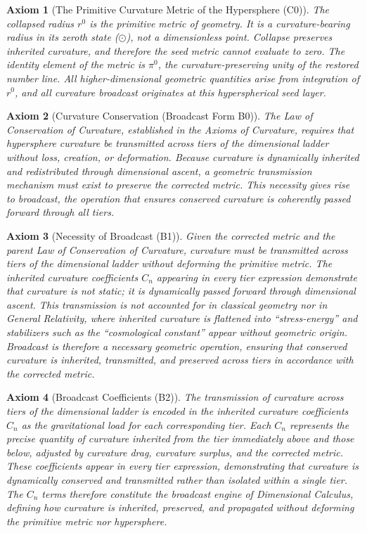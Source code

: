 \documentclass[final,onefignum,onetabnum]{siamart}
\newtheorem{axiom}{Axiom}
\begin{document}
\begin{axiom}[The Primitive Curvature Metric of the Hypersphere (C0)]
The collapsed radius $r^{0}$ is the primitive metric of geometry. It is a curvature-bearing radius in its zeroth state ($\odot$), not a dimensionless point. Collapse preserves inherited curvature, and therefore the seed metric cannot evaluate to zero. The identity element of the metric is $\pi^{0}$, the curvature-preserving unity of the restored number line. All higher-dimensional geometric quantities arise from integration of $r^{0}$, and all curvature broadcast originates at this hyperspherical seed layer.
\end{axiom}

\begin{axiom}[Curvature Conservation (Broadcast Form B0)]
The Law of Conservation of Curvature, established in the \textit{Axioms of Curvature}, requires that hypersphere curvature be transmitted across tiers of the dimensional ladder without loss, creation, or deformation. Because curvature is dynamically inherited and redistributed through dimensional ascent, a geometric transmission mechanism must exist to preserve the corrected metric. This necessity gives rise to broadcast, the operation that ensures conserved curvature is coherently passed forward through all tiers.
\end{axiom}

\begin{axiom}[Necessity of Broadcast (B1)]
Given the corrected metric and the parent Law of Conservation of Curvature, curvature must be transmitted across tiers of the dimensional ladder without deforming the primitive metric. The inherited curvature coefficients $C_n$ appearing in every tier expression demonstrate that curvature is not static; it is dynamically passed forward through dimensional ascent. This transmission is not accounted for in classical geometry nor in General Relativity, where inherited curvature is flattened into ``stress-energy'' and stabilizers such as the ``cosmological constant'' appear without geometric origin. Broadcast is therefore a necessary geometric operation, ensuring that conserved curvature is inherited, transmitted, and preserved across tiers in accordance with the corrected metric.
\end{axiom}

\begin{axiom}[Broadcast Coefficients (B2)]
The transmission of curvature across tiers of the dimensional ladder is encoded in the inherited curvature coefficients $C_n$ as the gravitational load for each corresponding tier. Each $C_n$ represents the precise quantity of curvature inherited from the tier immediately above and those below, adjusted by curvature drag, curvature surplus, and the corrected metric. These coefficients appear in every tier expression, demonstrating that curvature is dynamically conserved and transmitted rather than isolated within a single tier. The $C_n$ terms therefore constitute the broadcast engine of Dimensional Calculus, defining how curvature is inherited, preserved, and propagated without deforming the primitive metric nor hypersphere.
\end{axiom}
\end{document}
